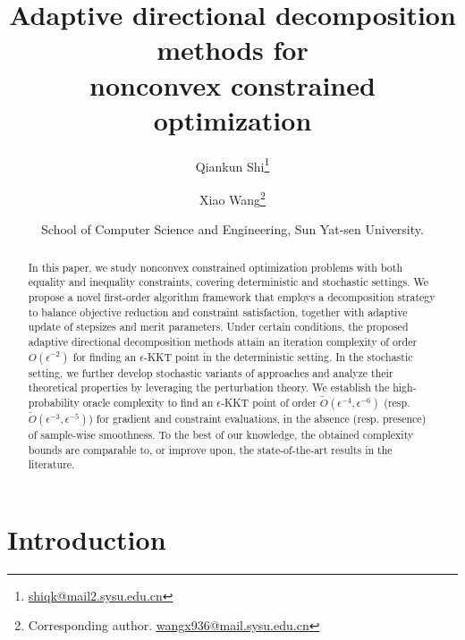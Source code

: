 \documentclass[11pt]{article}
\title{Adaptive directional decomposition methods for\\ nonconvex constrained optimization}
\author{%
  Qiankun Shi\thanks{\href{mailto:shiqk@mail2.sysu.edu.cn}{shiqk@mail2.sysu.edu.cn}}%
  \and
  Xiao Wang\thanks{Corresponding author. \href{mailto:wangx936@mail.sysu.edu.cn}{wangx936@mail.sysu.edu.cn}}%
}
\date{School of Computer Science and Engineering, Sun Yat-sen University.}
\begin{document}
\maketitle
\begin{abstract} 
In this paper, we study nonconvex constrained optimization problems with both equality and inequality constraints, covering deterministic and stochastic settings. We propose a novel first-order algorithm framework  that employs a decomposition strategy to balance objective reduction and constraint satisfaction, together with adaptive update of stepsizes and merit parameters. Under certain conditions, the proposed adaptive directional decomposition methods attain an iteration complexity of order \(O(\epsilon^{-2})\) for finding an \(\epsilon\)-KKT point in the deterministic setting. In the stochastic setting, we further develop stochastic variants of approaches and analyze their theoretical properties by leveraging the perturbation theory. We establish the high-probability oracle complexity to find an $\epsilon$-KKT point of  order \( \tilde O(\epsilon^{-4}, \epsilon^{-6}) \) (resp.  \(\tilde O(\epsilon^{-3}, \epsilon^{-5}) \)) for gradient and constraint evaluations, in the absence (resp. presence) of  sample-wise smoothness. To the best of our knowledge, the obtained complexity bounds are comparable to, or improve upon, the {state-of-the-art} results in the literature.
\end{abstract}

\section{Introduction}\label{sec1}
\end{document}
